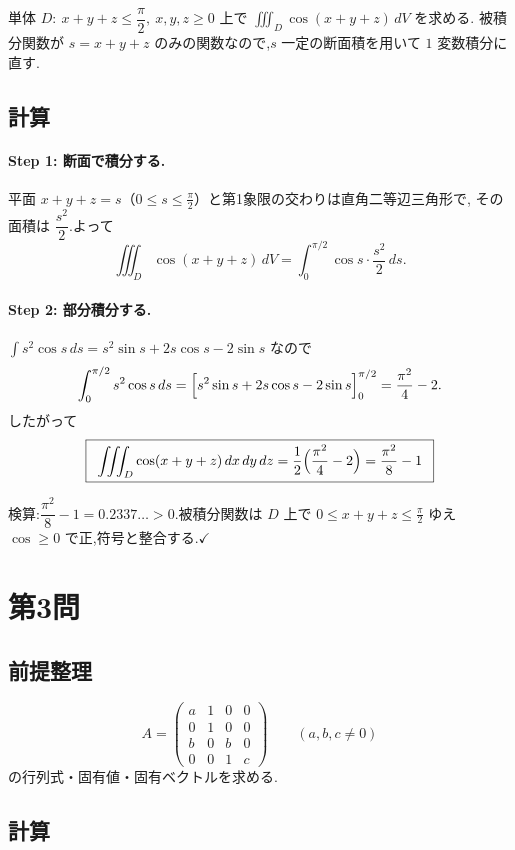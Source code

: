 \documentclass[11pt,a4paper]{article}
\begin{document}
単体 $D:\ x+y+z\le\dfrac\pi2,\ x,y,z\ge0$ 上で
$\displaystyle\iiint_D\cos(x+y+z)\,dV$ を求める.
被積分関数が $s=x+y+z$ のみの関数なので,$s$ 一定の断面積を用いて $1$ 変数積分に直す.

\subsection*{計算}

\paragraph{Step 1: 断面で積分する.}
平面 $x+y+z=s$（$0\le s\le\frac\pi2$）と第1象限の交わりは直角二等辺三角形で,
その面積は $\dfrac{s^2}{2}$.よって
\[
\iiint_D\cos(x+y+z)\,dV=\int_0^{\pi/2}\cos s\cdot\frac{s^2}{2}\,ds.
\]

\paragraph{Step 2: 部分積分する.}
$\displaystyle\int s^2\cos s\,ds=s^2\sin s+2s\cos s-2\sin s$ なので
\[
\int_0^{\pi/2}s^2\cos s\,ds
=\Bigl[s^2\sin s+2s\cos s-2\sin s\Bigr]_0^{\pi/2}
=\frac{\pi^2}{4}-2.
\]
したがって
\[
\ans{\
\iiint_D\cos(x+y+z)\,dx\,dy\,dz=\frac12\Bigl(\frac{\pi^2}{4}-2\Bigr)=\frac{\pi^2}{8}-1\ }
\]

検算:$\dfrac{\pi^2}{8}-1=0.2337\ldots>0$.被積分関数は $D$ 上で
$0\le x+y+z\le\frac\pi2$ ゆえ $\cos\ge0$ で正,符号と整合する.$\checkmark$

\section*{第3問}

\subsection*{前提整理}

\[
A=\begin{pmatrix}a&1&0&0\\0&1&0&0\\b&0&b&0\\0&0&1&c\end{pmatrix}
\qquad(a,b,c\neq0)
\]
の行列式・固有値・固有ベクトルを求める.

\subsection*{計算}
\end{document}
